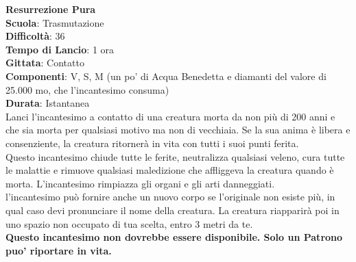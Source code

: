 \begin{multicols}{2}
\medskip\textbf{Resurrezione Pura}\\
\textbf{Scuola}: Trasmutazione\\
\textbf{Difficoltà}: 36\\
\textbf{Tempo di Lancio}: 1 ora\\
\textbf{Gittata}: Contatto\\
\textbf{Componenti}: V, S, M (un po' di Acqua Benedetta e diamanti del valore di 25.000 mo, che l'incantesimo consuma)\\
\textbf{Durata}: Istantanea\\
Lanci l'incantesimo a contatto di una creatura morta da non più di 200 anni e che sia morta per qualsiasi motivo ma non di vecchiaia. Se la sua anima è libera e consenziente, la creatura ritornerà in vita con tutti i suoi punti ferita. \\
Questo incantesimo chiude tutte le ferite, neutralizza qualsiasi veleno, cura tutte le malattie e rimuove qualsiasi maledizione che affliggeva la creatura quando è morta. L'incantesimo rimpiazza gli organi e gli arti danneggiati.\\
l'incantesimo può fornire anche un nuovo corpo se l'originale non esiste più, in qual caso devi pronunciare il nome della creatura. La creatura riapparirà poi in uno spazio non occupato di tua scelta, entro 3 metri da te. \\
\textbf{Questo incantesimo non dovrebbe essere disponibile. Solo un Patrono puo' riportare in vita.}


\end{multicols}
